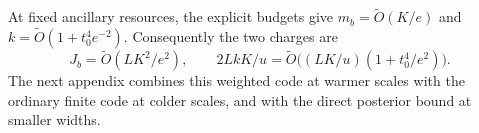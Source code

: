 At fixed ancillary resources, the explicit budgets give
$m_b=\widetilde O(K/e)$ and
$k=\widetilde O(1+t_0^4e^{-2})$.
Consequently the two charges are
\[
 J_b=\widetilde O(LK^2/e^2),\qquad
 2LkK/u=\widetilde O\bigl((LK/u)(1+t_0^4/e^2)\bigr).
\]
The next appendix combines this weighted code at warmer scales with the
ordinary finite code at colder scales, and with the direct posterior
bound at smaller widths.
